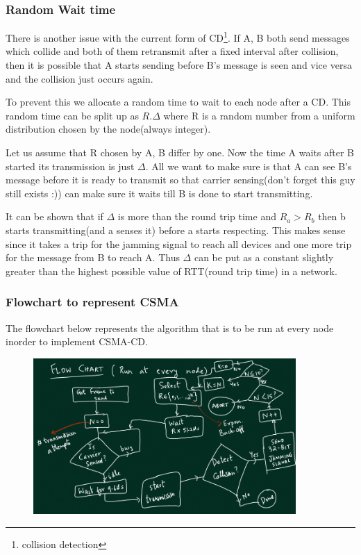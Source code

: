 \documentclass[12pt]{article}
\begin{document}
\subsubsection{Random Wait time}
There is another issue with the current form of CD\footnote{collision detection}. If A, B both send messages which 
collide and both of them retransmit after a fixed interval after collision, then it is possible that A starts
sending before B's message is seen and vice versa and the collision just occurs again. 

To prevent this we allocate a random time to wait to each node after a CD. This random time can be split up 
as \(R.\Delta\) where R is a random number from a uniform distribution chosen by the node(always integer). 

Let us assume that R chosen by A, B differ by one. Now the time A waits after B started its 
transmission is just \(\Delta\). All we want to make sure is that A can see B's message 
before it is ready to transmit so that carrier sensing(don't forget this guy still exists :)) can make sure it waits till B is done to start transmitting. 

It can be shown that if \(\Delta\) is more than the round trip time and \(R_a > R_b\) then b starts transmitting(and a senses it) before a starts respecting. 
This makes sense since it takes a trip for the jamming signal to reach all devices and one more trip for the message from B to reach A. Thus \(\Delta\) can be
put as a constant slightly greater than the highest possible value of RTT(round trip time) in a network. 

\subsubsection{Flowchart to represent CSMA}
The flowchart below represents the algorithm that is to be run at every node inorder to implement CSMA-CD. 
\begin{figure}[H]
    \centering
    \includegraphics*[width=10cm]{Diagrams/CSMA.png}
\end{figure}
\end{document}
